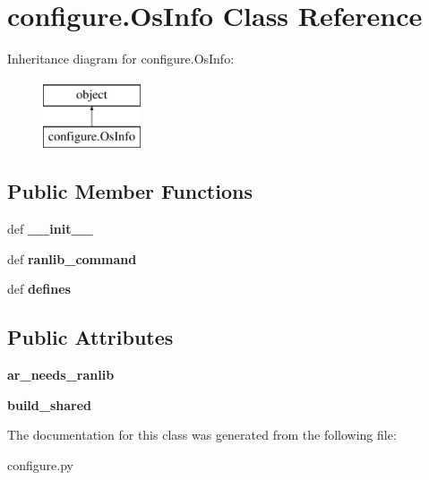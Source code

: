 \hypertarget{classconfigure_1_1OsInfo}{\section{configure.\-Os\-Info Class Reference}
\label{classconfigure_1_1OsInfo}
}
Inheritance diagram for configure.\-Os\-Info\-:\begin{figure}[H]
\begin{center}
\leavevmode
\includegraphics[height=2.000000cm]{classconfigure_1_1OsInfo}
\end{center}
\end{figure}
\subsection*{Public Member Functions}
\begin{DoxyCompactItemize}
\item 
\hypertarget{classconfigure_1_1OsInfo_a456207429ccacd6260b6bdf0d1de77d6}{def {\bfseries \-\_\-\-\_\-init\-\_\-\-\_\-}}\label{classconfigure_1_1OsInfo_a456207429ccacd6260b6bdf0d1de77d6}

\item 
\hypertarget{classconfigure_1_1OsInfo_ac7642861ee978a0966663c5c14621361}{def {\bfseries ranlib\-\_\-command}}\label{classconfigure_1_1OsInfo_ac7642861ee978a0966663c5c14621361}

\item 
\hypertarget{classconfigure_1_1OsInfo_aeb0bc57ed365b8c8b8f0d6a4420e0d0b}{def {\bfseries defines}}\label{classconfigure_1_1OsInfo_aeb0bc57ed365b8c8b8f0d6a4420e0d0b}

\end{DoxyCompactItemize}
\subsection*{Public Attributes}
\begin{DoxyCompactItemize}
\item 
\hypertarget{classconfigure_1_1OsInfo_ab84863f5e14f07ee7387ee874350ccef}{{\bfseries ar\-\_\-needs\-\_\-ranlib}}\label{classconfigure_1_1OsInfo_ab84863f5e14f07ee7387ee874350ccef}

\item 
\hypertarget{classconfigure_1_1OsInfo_a22c12e85b906c2eb7c73c1f8fdf0d719}{{\bfseries build\-\_\-shared}}\label{classconfigure_1_1OsInfo_a22c12e85b906c2eb7c73c1f8fdf0d719}

\end{DoxyCompactItemize}


The documentation for this class was generated from the following file\-:\begin{DoxyCompactItemize}
\item 
configure.\-py\end{DoxyCompactItemize}
